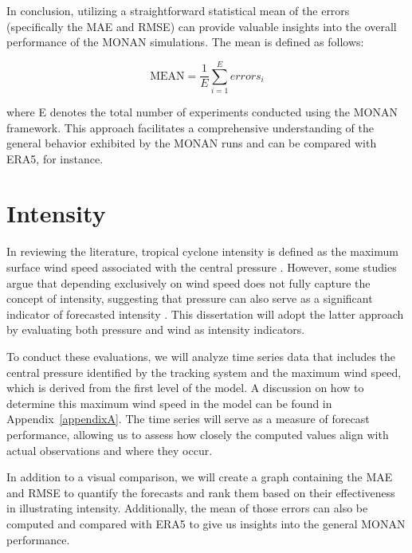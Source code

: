 In conclusion, utilizing a straightforward statistical mean of the errors (specifically the MAE and RMSE) can provide valuable insights into the overall performance of the MONAN simulations. The mean is defined as follows:

\begin{equation}
    \text{MEAN} = \frac{1}{E} \sum_{i=1}^{E} errors_i
\end{equation}

where E denotes the total number of experiments conducted using the MONAN framework. This approach facilitates a comprehensive understanding of the general behavior exhibited by the MONAN runs and can be compared with ERA5, for instance.

\section{Intensity}

In reviewing the literature, tropical cyclone intensity is defined as the maximum surface wind speed associated with the central pressure \cite{demaria2007evaluation, landsea2013atlantic}. However, some studies argue that depending exclusively on wind speed does not fully capture the concept of intensity, suggesting that pressure can also serve as a significant indicator of forecasted intensity \cite{shepherd2017sensitivity, heming2017tropical}. This dissertation will adopt the latter approach by evaluating both pressure and wind as intensity indicators.

To conduct these evaluations, we will analyze time series data that includes the central pressure identified by the tracking system and the maximum wind speed, which is derived from the first level of the model. A discussion on how to determine this maximum wind speed in the model can be found in Appendix~\ref{appendixA}. The time series will serve as a measure of forecast performance, allowing us to assess how closely the computed values align with actual observations and where they occur.

In addition to a visual comparison, we will create a graph containing the MAE and RMSE to quantify the forecasts and rank them based on their effectiveness in illustrating intensity. Additionally, the mean of those errors can also be computed and compared with ERA5 to give us insights into the general MONAN performance. 


